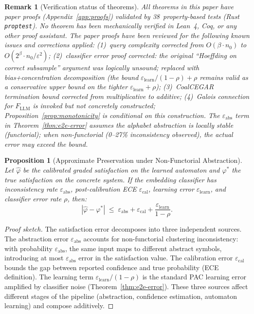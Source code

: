 \documentclass[11pt]{article}
\newtheorem{proposition}[theorem]{Proposition}
\newtheorem{remark}[theorem]{Remark}
\begin{document}
\begin{remark}[Verification status of theorems]
All theorems in this paper have paper proofs
(Appendix~\ref{app:proofs}) validated by 38~property-based tests
(Rust \texttt{proptest}).  \emph{No theorem has been mechanically
verified in Lean~4, Coq, or any other proof assistant.}
The paper proofs have been reviewed for the following known issues
and corrections applied:
(1)~query complexity corrected from $O(\beta \cdot n_0)$ to
$O(2^\beta \cdot n_0 / \varepsilon^2)$;
(2)~classifier error proof corrected: the original ``Hoeffding on
correct subsample'' argument was logically unsound; replaced with
bias+concentration decomposition (the bound $\varepsilon_{\mathrm{learn}}
/(1{-}\rho) + \rho$ remains valid as a conservative upper bound on
the tighter $\varepsilon_{\mathrm{learn}} + \rho$);
(3)~CoalCEGAR termination bound corrected from multiplicative
to additive;
(4)~Galois connection for $F_{\mathrm{LLM}}$ is invoked but
not concretely constructed; Proposition~\ref{prop:monotonicity}
is conditional on this construction.
The $\varepsilon_{\mathrm{abs}}$ term in Theorem~\ref{thm:e2e-error}
assumes the alphabet abstraction is locally stable (functorial);
when non-functorial (0--27\% inconsistency observed), the actual
error may exceed the bound.
\end{remark}

\begin{proposition}[Approximate Preservation under Non-Functorial Abstraction]\label{prop:approx-preservation}
Let $\hat{\varphi}$ be the calibrated graded satisfaction on the
learned automaton and $\varphi^*$ the true satisfaction on the
concrete system.  If the embedding classifier has inconsistency rate
$\varepsilon_{\mathrm{abs}}$, post-calibration ECE
$\varepsilon_{\mathrm{cal}}$, learning error
$\varepsilon_{\mathrm{learn}}$, and classifier error rate $\rho$, then:
\[
  |\hat{\varphi} - \varphi^*| \;\le\;
  \varepsilon_{\mathrm{abs}} + \varepsilon_{\mathrm{cal}}
  + \frac{\varepsilon_{\mathrm{learn}}}{1 - \rho}.
\]
\end{proposition}

\begin{proof}[Proof sketch]
The satisfaction error decomposes into three independent sources.
The abstraction error $\varepsilon_{\mathrm{abs}}$ accounts for
non-functorial clustering inconsistency: with probability
$\varepsilon_{\mathrm{abs}}$, the same input maps to different
abstract symbols, introducing at most $\varepsilon_{\mathrm{abs}}$
error in the satisfaction value.  The calibration error
$\varepsilon_{\mathrm{cal}}$ bounds the gap between reported
confidence and true probability (ECE definition).  The learning
term $\varepsilon_{\mathrm{learn}}/(1-\rho)$ is the standard
PAC learning error amplified by classifier noise
(Theorem~\ref{thm:e2e-error}).  These three sources affect
different stages of the pipeline (abstraction, confidence
estimation, automaton learning) and compose additively.
\end{proof}
\end{document}
